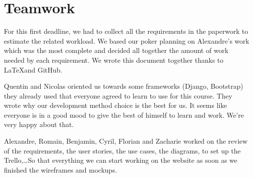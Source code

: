 \section{Teamwork}


For this first deadline, we had to collect all the requirements in the
paperwork to estimate the related workload. We based our poker planning
on Alexandre's work which was the most complete and decided all together the
amount of work needed by each requirement. We wrote this document
together thanks to \LaTeX  and GitHub.\newline

Quentin and Nicolas oriented us towards some frameworks (Django,
Bootstrap) they already used that everyone agreed to learn to use for
this course. They wrote why our development method choice is the best
for us. It seems like everyone is in a good mood to give the best of
himself to learn and work. We're very happy about that. \newline

Alexandre, Romain, Benjamin, Cyril, Florian and Zacharie worked on the
review of the requirements, the user stories, the use cases, the
diagrams, to set up the Trello,\ldots So that everything we can start
working on the website as soon as we finished the wireframes and
mockups. \newline
